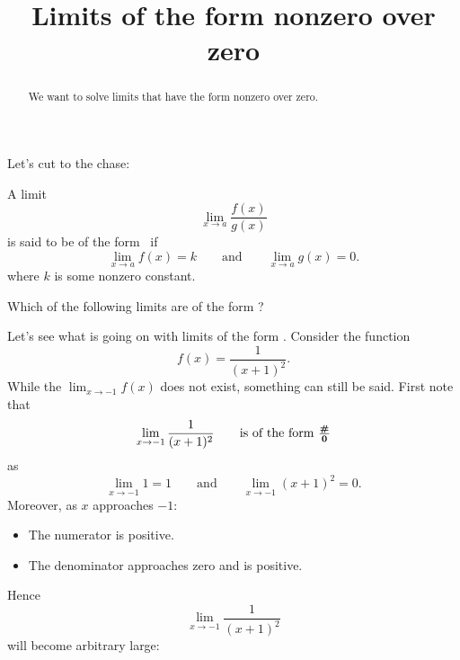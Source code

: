 \documentclass{ximera}
\title[Dig-In:]{Limits of the form nonzero over zero}
\begin{document}
\begin{abstract}
  We want to solve limits that have the form nonzero over zero.
\end{abstract}

\maketitle

Let's cut to the chase:

\begin{definition}
  A limit
  \[
  \lim_{x\to a} \frac{f(x)}{g(x)}
  \]
  is said to be of the form \numOverZero\ if
  \[
  \lim_{x\to a} f(x) = k\qquad\text{and}\qquad \lim_{x\to a} g(x) =0.
  \]
  where $k$ is some nonzero constant.
\end{definition}

\begin{question}
  Which of the following limits are of the form \numOverZero?
  \begin{selectAll}
  \end{selectAll}
\end{question}


Let's see what is going on with limits of the form \numOverZero.
Consider the function
  \[
  f(x) = \frac{1}{(x+1)^2}.
  \]
While the $\lim_{x\to -1} f(x)$ does not exist, something can still be
said. First note that
\[
\lim_{x\to -1} \frac{1}{(x+1)^2}\qquad\text{is of the form $\boldsymbol{\tfrac{\#}{0}}$}
\]
as
\[
\lim_{x\to -1} 1 = 1 \qquad\text{and}\qquad \lim_{x\to -1}(x+1)^2 = 0.
\]
Moreover, as $x$ approaches $-1$:
\begin{itemize}
\item The numerator is positive.
\item The denominator approaches zero and is positive.
\end{itemize}
Hence
\[
\lim_{x\to -1} \frac{1}{(x+1)^2}
\]
will become arbitrary large:
\begin{image}
\end{image}
\end{document}

